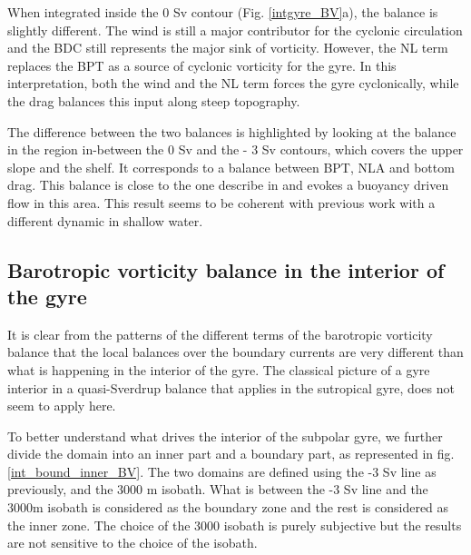 \documentclass[11pt,a4paper]{article}
\begin{document}
When integrated inside the 0 Sv contour (Fig. \ref{intgyre_BV}a), the balance is slightly different. The wind is still a major contributor for the cyclonic circulation and the BDC still represents the major sink of vorticity. However, the NL term replaces the BPT as a source of cyclonic vorticity for the gyre. In this interpretation, both the wind and the NL term forces the gyre cyclonically, while the drag balances this input along steep topography. 

The difference between the two balances is highlighted by looking at the balance in the region in-between the 0 Sv and the - 3 Sv contours, which covers the upper slope and the shelf. It corresponds to a balance between BPT, NLA and bottom drag. This balance is close to the one describe in \citet{csanady1978} and evokes a buoyancy driven flow in this area. This result seems to be coherent with previous work with a different dynamic in shallow water. %
 
\subsection{Barotropic vorticity balance in the interior of the gyre}

It is clear from the patterns of the different terms of the barotropic vorticity balance that the local balances over the boundary currents are very different than what is happening in the interior of the gyre. The classical picture of a gyre interior in a quasi-Sverdrup balance that applies in the sutropical gyre,  does not seem to apply here. 

To better understand what drives the interior of the subpolar gyre, we further divide the domain into an inner part and a boundary part, as represented in fig. \ref{int_bound_inner_BV}. The two domains are defined using the -3 Sv line as previously, and the 3000 m isobath. What is between the -3 Sv line and the 3000m isobath is considered as the boundary zone and the rest is considered as the inner zone. The choice of the 3000 isobath is purely subjective but the results are not sensitive to the choice of the isobath. 
\end{document}
